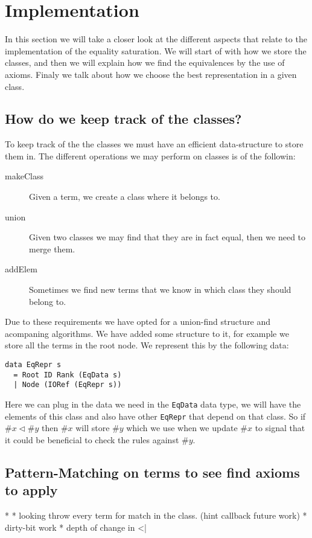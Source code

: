 
\section{Implementation}
In this section we will take a closer look at the different aspects that relate
to the implementation of the equality saturation. We will start of with how
we store the classes, and then we will explain how we find the equivalences by 
the use of axioms. Finaly we talk about how we choose the best representation in
a given class.
\subsection{How do we keep track of the classes?}
To keep track of the the classes we must have an efficient data-structure to store
them in. The different operations we may perform on classes is of the followin:

\begin{description}
  \item[makeClass] Given a term, we create a class where it belongs to.
  \item[union]     Given two classes we may find that they are in fact equal, then
                   we need to merge them.
  \item[addElem]   Sometimes we find new terms that we know in which class they
                   should belong to.
\end{description}

Due to these requirements we have opted for a union-find structure and acompaning
algorithms. We have added some structure to it, for example we store all the terms
in the root node. We represent this by the following data:

\begin{verbatim}
data EqRepr s
  = Root ID Rank (EqData s)
  | Node (IORef (EqRepr s))
\end{verbatim}

Here we can plug in the data we need in the \verb|EqData| data type, we will have
the elements of this class and also have other \verb|EqRepr| that depend on that
class. So if $\#x \lhd \#y$ then $\#x$ will store $\#y$ which we use when we update
$\#x$ to signal that it could be beneficial to check the rules against $\#y$.

\subsection{Pattern-Matching on terms to see find axioms to apply}
* * looking throw every term for match in the class. (hint callback future work) 
* dirty-bit work
  * depth of change in <|
